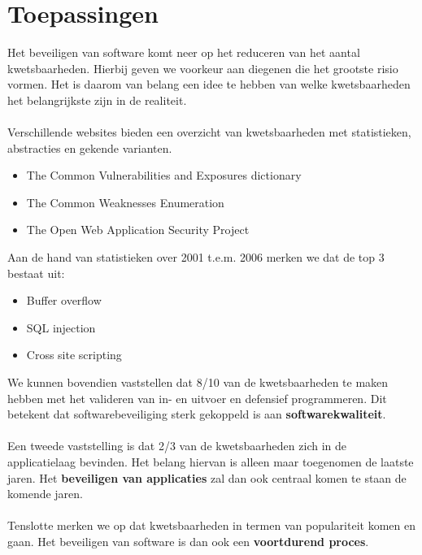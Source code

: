 \documentclass[../main.tex]{subfiles}
\begin{document}
\section{Toepassingen}
Het beveiligen van software komt neer op het reduceren van het aantal kwetsbaarheden. Hierbij geven we voorkeur aan diegenen die het grootste risio vormen. Het is daarom van belang een idee te hebben van welke kwetsbaarheden het belangrijkste zijn in de realiteit. 
\\\\
Verschillende websites bieden een overzicht van kwetsbaarheden met statistieken, abstracties en gekende varianten.
\begin{itemize}
	\item The Common Vulnerabilities and Exposures dictionary
	\item The Common Weaknesses Enumeration
	\item The Open Web Application Security Project
\end{itemize}
\noindent
Aan de hand van statistieken over 2001 t.e.m. 2006 merken we dat de top 3 bestaat uit:
\begin{itemize}
	\item Buffer overflow
	\item SQL injection
	\item Cross site scripting
\end{itemize} 
We kunnen bovendien vaststellen dat 8/10 van de kwetsbaarheden te maken hebben met het valideren van in- en uitvoer en defensief programmeren. Dit betekent dat softwarebeveiliging sterk gekoppeld is aan \textbf{softwarekwaliteit}.
\\\\
Een tweede vaststelling is dat 2/3 van de kwetsbaarheden zich in de applicatielaag bevinden. Het belang hiervan is alleen maar toegenomen de laatste jaren. Het \textbf{beveiligen van applicaties} zal dan ook centraal komen te staan de komende jaren.
\\\\
Tenslotte merken we op dat kwetsbaarheden in termen van populariteit komen en gaan. Het beveiligen van software is dan ook een \textbf{voortdurend proces}.
\end{document}

